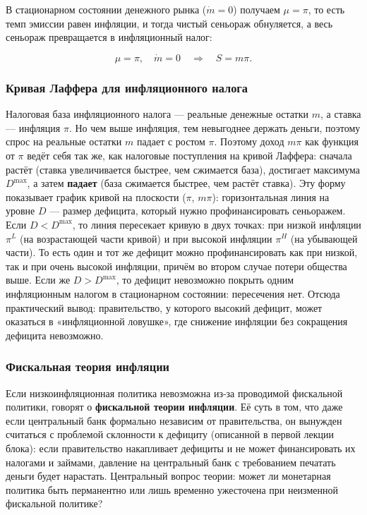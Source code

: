 \documentclass[11pt,a4paper]{article}
\begin{document}
В стационарном состоянии денежного рынка ($\dot m=0$) получаем $\mu=\pi$, то есть темп эмиссии равен инфляции, и тогда чистый сеньораж обнуляется, а весь сеньораж превращается в инфляционный налог:
\begin{formulabox}
\begin{equation*}
\mu=\pi,\quad \dot m=0\quad\Rightarrow\quad S=m\pi.
\end{equation*}
\end{formulabox}

\subsubsection{Кривая Лаффера для инфляционного налога}

Налоговая база инфляционного налога --- реальные денежные остатки $m$, а ставка --- инфляция $\pi$. Но чем выше инфляция, тем невыгоднее держать деньги, поэтому спрос на реальные остатки $m$ падает с ростом $\pi$. Поэтому доход $m\pi$ как функция от $\pi$ ведёт себя так же, как налоговые поступления на кривой Лаффера: сначала растёт (ставка увеличивается быстрее, чем сжимается база), достигает максимума $D^{\max}$, а затем \textbf{падает} (база сжимается быстрее, чем растёт ставка). Эту форму показывает график кривой на плоскости ($\pi$, $m\pi$): горизонтальная линия на уровне $D$ --- размер дефицита, который нужно профинансировать сеньоражем. Если $D<D^{\max}$, то линия пересекает кривую в двух точках: при низкой инфляции $\pi^{L}$ (на возрастающей части кривой) и при высокой инфляции $\pi^{H}$ (на убывающей части). То есть один и тот же дефицит можно профинансировать как при низкой, так и при очень высокой инфляции, причём во втором случае потери общества выше. Если же $D>D^{\max}$, то дефицит невозможно покрыть одним инфляционным налогом в стационарном состоянии: пересечения нет. Отсюда практический вывод: правительство, у которого высокий дефицит, может оказаться в «инфляционной ловушке», где снижение инфляции без сокращения дефицита невозможно.

\subsubsection{Фискальная теория инфляции}

Если низкоинфляционная политика невозможна из-за проводимой фискальной политики, говорят о \textbf{фискальной теории инфляции}. Её суть в том, что даже если центральный банк формально независим от правительства, он вынужден считаться с проблемой склонности к дефициту (описанной в первой лекции блока): если правительство накапливает дефициты и не может финансировать их налогами и займами, давление на центральный банк с требованием печатать деньги будет нарастать. Центральный вопрос теории: может ли монетарная политика быть перманентно или лишь временно ужесточена при неизменной фискальной политике?
\end{document}
